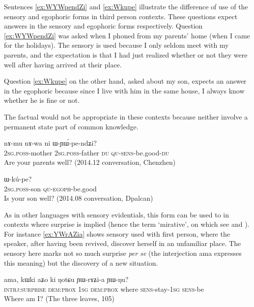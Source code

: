 \documentclass[oldfontcommands,oneside,a4paper,11pt]{article}
\newcommand{\ipa}[1]{{\phon \mbox{#1}}} %
\begin{document}
Sentences \ref{ex:WYWpendZi} and \ref{ex:Wkupe} illustrate the difference of use of the sensory and egophoric forms in third person contexts. These questions expect answers in the sensory and egophoric forms respectively. Question \ref{ex:WYWpendZi} was asked when I phoned from my parents' home (when I came for the holidays). The sensory is used because I only seldom meet with my parents, and the expectation is that I had just realized whether or not they were well after having arrived at their place. 

Question \ref{ex:Wkupe} on the other hand, asked about my son, expects an answer in the egophoric because since I live with him in the same house, I always know whether he is fine or not.

The factual would not be appropriate in these contexts because neither involve a permanent state part of common knowledge.

\begin{exe}
\ex \label{ex:WYWpendZi}
\gll 
\ipa{nɤ-mu}  	\ipa{nɤ-wa}  	\ipa{ni}  	\ipa{ɯ-ɲɯ́-pe-ndʑi?}  \\
\textsc{2sg.poss}-mother \textsc{2sg.poss}-father \textsc{du} \textsc{qu-sens}-be.good-\textsc{du} \\
\glt Are your parents well? (2014.12 conversation, Chenzhen)
\end{exe}


\begin{exe}
\ex \label{ex:Wkupe}
\gll \ipa{nɤ-tɕɯ} \ipa{ɯ-kú-pe?}\\
\textsc{2sg.poss}-son \textsc{qu-egoph}-be.good\\
\glt Is your son well? (2014.08 conversation, Dpalcan)
\end{exe}

 
 As in other languages with sensory evidentials, this form can be used to in contexts where surprise is implied (hence the term `mirative', on which see \citealt{delancey97mirative} and \citealt{hill12mirativity}). For instance \ref{ex:YWrAZia} shows sensory used with first person, where the speaker, after having been revived, discover herself in an unfamiliar place. The sensory here marks not so much surprise \textit{per se} (the interjection \ipa{ama} expresses this meaning) but the discovery of a new situation.

\begin{exe}
\ex \label{ex:YWrAZia}
\gll 
\ipa{ama,}  	\ipa{kɯki}  	\ipa{aʑo}  	\ipa{ki}  	\ipa{ŋotɕu}  	\ipa{ɲɯ-rɤʑi-a}  	\ipa{ɲɯ-ŋu?}  \\
\textsc{intrj:surprise} \textsc{dem:prox} \textsc{1sg} \textsc{dem:prox} where \textsc{sens}-stay-\textsc{1sg} \textsc{sens}-be \\
\glt Where am I? (The three leaves, 105)
\end{exe}
\end{document}
